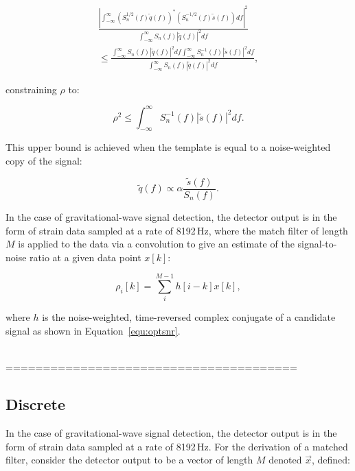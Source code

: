\documentclass[aps,prd,nofootinbib,twocolumn,reprint,superscriptaddress,showpacs,showkeys,longbibliography]{revtex4-1}
\begin{document}
\begin{equation}
\begin{split}
\frac{\left|\int_{-\infty}^{\infty} \left(S_{n}^{1/2}(f)\tilde{q}(f)\right)^{\ast}\left(S_{n}^{-1/2}(f)\tilde{s}(f)\right)df\right|^{2}}
{\int_{-\infty}^{\infty}S_{n}(f)|\tilde{q}(f)|^{2}df} 
\\
\le
\frac{\int_{-\infty}^{\infty}S_{n}(f)|\tilde{q}(f)|^{2}df \int_{-\infty}^{\infty}S_{n}^{-1}(f)|\tilde{s}(f)|^{2}df}
{\int_{-\infty}^{\infty}S_{n}(f)|\tilde{q}(f)|^{2}df},
\end{split}
\end{equation}

constraining $\rho$ to:

\begin{equation}
\rho^{2} \le \int_{-\infty}^{\infty}S_{n}^{-1}(f)|\tilde{s}(f)|^{2}df.
\end{equation}

This upper bound is achieved when the template is equal to a noise-weighted copy of the signal:

\begin{equation}\label{equ:optsnr}
\tilde{q}(f) \propto \alpha\frac{\tilde{s}(f)}{S_n(f)}.
\end{equation}

In the case of gravitational-wave signal detection, the detector output is in the form of strain data sampled at a rate of 8192\,Hz, where the match filter of length $M$ is applied to the data via a convolution to give an estimate of the signal-to-noise ratio at a given data point $x[k]$:

\begin{equation}
\rho_i[k] = \sum_{i}^{M-1}h[i-k]x[k],
\end{equation}

where $h$ is the noise-weighted, time-reversed complex conjugate of a candidate signal as shown in Equation~\ref{equ:optsnr}.

\ \\
=======================================
\subsection*{Discrete}

In the case of gravitational-wave signal detection, the detector output is in the form of strain data sampled at a rate of 8192\,Hz.
For the derivation of a matched filter, consider the detector output to be a vector of length $M$ denoted $\vec{x}$, defined:
\end{document}
